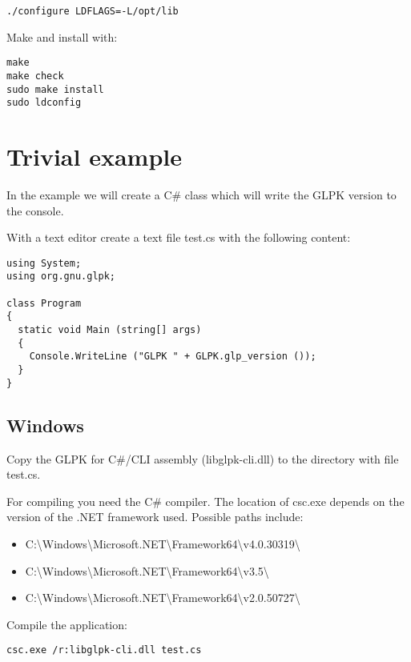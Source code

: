 \documentclass[a4paper,11pt]{report}
\begin{document}
\begin{lstlisting}
./configure LDFLAGS=-L/opt/lib
\end{lstlisting}

Make and install with:

\begin{lstlisting}
make
make check
sudo make install
sudo ldconfig
\end{lstlisting}

\section{Trivial example}

In the example we will create a C\# class which will write the GLPK version to
the console.

With a text editor create a text file test.cs with the following content:

\begin{lstlisting}
using System;
using org.gnu.glpk;

class Program
{
  static void Main (string[] args)
  {
    Console.WriteLine ("GLPK " + GLPK.glp_version ());
  }
}
\end{lstlisting}

\subsection{Windows}

Copy the GLPK for C\#/CLI assembly (libglpk-cli.dll) to the directory with file
test.cs.

For compiling you need the C\# compiler.
The location of csc.exe depends on the version of the .NET framework used.
Possible paths include:

\begin{itemize}
\item C:\textbackslash Windows\textbackslash Microsoft.NET\textbackslash Framework64\textbackslash v4.0.30319\textbackslash 
\item C:\textbackslash Windows\textbackslash Microsoft.NET\textbackslash Framework64\textbackslash v3.5\textbackslash 
\item C:\textbackslash Windows\textbackslash Microsoft.NET\textbackslash Framework64\textbackslash v2.0.50727\textbackslash 
\end{itemize}

Compile the application:

\begin{lstlisting}
csc.exe /r:libglpk-cli.dll test.cs
\end{lstlisting}
\end{document}
